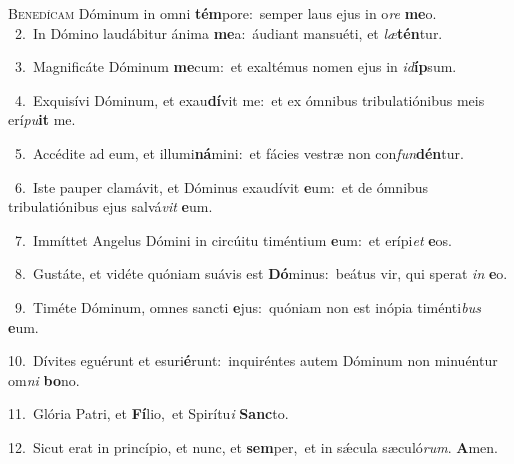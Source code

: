 \lettrine{\initial\textcolor{\initialcolor}{B}}{enedícam} Dóminum in omni \textbf{tém}\-pore:~\star semper laus ejus in o\textit{re} \textbf{me}\-o.\\
{\numbfont\textcolor{\numbcolor}{~2.}}~In Dómino laudábitur ánima \textbf{me}\-a:~\star áudiant mansuéti, et \textit{læ}\-\textbf{tén}tur.\par
{\numbfont\textcolor{\numbcolor}{~3.}}~Magnificáte Dóminum \textbf{me}\-cum:~\star et exaltémus nomen ejus in \textit{id}\-\textbf{íp}sum.\par
{\numbfont\textcolor{\numbcolor}{~4.}}~Exquisívi Dóminum, et exau\-\textbf{dí}\-vit me:~\star et ex ómnibus tribulatiónibus meis erí\-\textit{pu}\-\textbf{it} me.\par
{\numbfont\textcolor{\numbcolor}{~5.}}~Accédite ad eum, et illumi\-\textbf{ná}\-mini:~\star et fácies vestræ non con\-\textit{fun}\-\textbf{dén}tur.\par
{\numbfont\textcolor{\numbcolor}{~6.}}~Iste pauper clamávit, et Dóminus exaudívit \textbf{e}\-um:~\star et de ómnibus tribulatiónibus ejus salvá\textit{vit} \textbf{e}\-um.\par
{\numbfont\textcolor{\numbcolor}{~7.}}~Immíttet Angelus Dómini in circúitu timéntium \textbf{e}\-um:~\star et erípi\textit{et} \textbf{e}\-os.\par
{\numbfont\textcolor{\numbcolor}{~8.}}~Gustáte, et vidéte quóniam suávis est \textbf{Dó}\-minus:~\star beátus vir, qui sperat \textit{in} \textbf{e}\-o.\par
{\numbfont\textcolor{\numbcolor}{~9.}}~Timéte Dóminum, omnes sancti \textbf{e}\-jus:~\star quóniam non est inópia timénti\textit{bus} \textbf{e}\-um.\par
{\numbfont\textcolor{\numbcolor}{10.}}~Dívites eguérunt et esuri\-\textbf{é}\-runt:~\star inquiréntes autem Dóminum non minuéntur om\textit{ni} \textbf{bo}\-no.\par
{\numbfont\textcolor{\numbcolor}{11.}}~Glória Patri, et \textbf{Fí}\-lio,~\star et Spirítu\textit{i} \textbf{Sanc}\-to.\par
{\numbfont\textcolor{\numbcolor}{12.}}~Sicut erat in princípio, et nunc, et \textbf{sem}\-per,~\star et in sǽcula sæculó\-\textit{rum}\-. \textbf{A}\-men.\par
